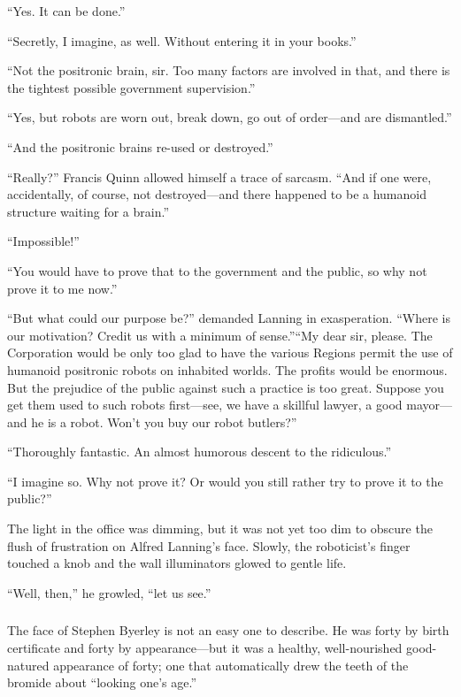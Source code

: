 \documentclass[10pt,a5paper,twoside]{book}
\begin{document}
“Yes. It can be done.”

“Secretly, I imagine, as well. Without entering it in your books.”

“Not the positronic brain, sir. Too many factors are involved in that, and there is the tightest possible government supervision.”

“Yes, but robots are worn out, break down, go out of order—and are dismantled.”

“And the positronic brains re-used or destroyed.”

“Really?” Francis Quinn allowed himself a trace of sarcasm. “And if one were, accidentally, of course, not destroyed—and there happened to be a humanoid structure waiting for a brain.”

“Impossible!”

“You would have to prove that to the government and the public, so why not prove it to me now.”

“But what could our purpose be?” demanded Lanning in exasperation. “Where is our motivation? Credit us with a minimum of sense.”“My dear sir, please. The Corporation would be only too glad to have the various Regions permit the use of humanoid positronic robots on inhabited worlds. The profits would be enormous. But the prejudice of the public against such a practice is too great. Suppose you get them used to such robots first—see, we have a skillful lawyer, a good mayor—and he is a robot. Won’t you buy our robot butlers?”

“Thoroughly fantastic. An almost humorous descent to the ridiculous.”

“I imagine so. Why not prove it? Or would you still rather try to prove it to the public?”

The light in the office was dimming, but it was not yet too dim to obscure the flush of frustration on Alfred Lanning’s face. Slowly, the roboticist’s finger touched a knob and the wall illuminators glowed to gentle life.

“Well, then,” he growled, “let us see.”

\subsubsection*{}
The face of Stephen Byerley is not an easy one to describe. He was forty by birth certificate and forty by appearance—but it was a healthy, well-nourished good-natured appearance of forty; one that automatically drew the teeth of the bromide about “looking one’s age.”
\end{document}
